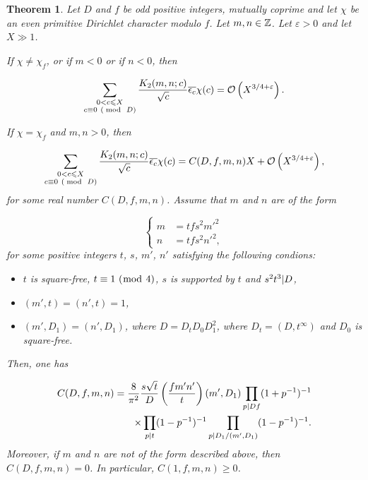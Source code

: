 \documentclass[leqno,10pt]{amsart}
\theoremstyle{plain}
\numberwithin{equation}{section}
\newtheorem{thm}{Theorem}[section]
\theoremstyle{definition}
\theoremstyle{remark}
\begin{document}
\begin{thm}\label{intro:thm}
Let $D$ and $f$ be odd positive integers, mutually coprime and let $\chi$ be an even primitive Dirichlet character modulo $f$. Let $m,n\in \mathbb{Z}$. Let $\varepsilon>0$ and let $X\gg 1$. 

If $\chi\neq \chi_f$, or if $m<0$ or if $n<0$, then

\begin{equation*}
\sum_{\substack{0<c\leqslant X \\ c\equiv 0\ (\bmod\  D)}}
\frac{K_2(m,n;c)}{\sqrt{c}} \overline{\epsilon_c} \chi(c) = \mathcal{O}\left(X^{3/4+\varepsilon}\right).
\end{equation*}

If $\chi=\chi_f$ and $m,n>0$, then
 
\begin{equation*}
\sum_{\substack{0<c\leqslant X \\ c\equiv 0\ (\bmod\  D)}}
\frac{K_2(m,n;c)}{\sqrt{c}} \overline{\epsilon_c} \chi(c) = C(D,f,m,n) X +\mathcal{O}\left(X^{3/4+\varepsilon}\right),
\end{equation*}
for some real number $C(D,f,m,n)$. Assume that $m$ and $n$ are of the form 

\begin{equation*}
\left\{\begin{aligned}
m&=tfs^2m'^2\\
n&=tfs^2n'^2,
\end{aligned}\right.
\end{equation*}
for some positive integers $t$, $s$, $m'$, $n'$ satisfying the following condions:

\begin{itemize}
\item[$(i)$] $t$ is square-free, $t\equiv 1 \ (\bmod\  4)$, $s$ is supported by $t$ and $s^2t^3 \vert D$,
\item[$(ii)$] $(m',t)=(n',t)=1$,
\item[$(iii)$] $(m',D_1)=(n',D_1)$, where $D=D_tD_0D_1^2$, where $D_t=(D,t^\infty)$ and $D_0$ is square-free.
\end{itemize}
Then, one has

\begin{equation*}
\begin{split}
C(D,f,m,n) = \frac{8}{\pi^2} \frac{s\sqrt{t}}{D} \left(\frac{fm'n'}{t}\right) (m',D_1) \prod_{p\vert Df} (1+p^{-1})^{-1} \\
\times \prod_{p\vert t}(1-p^{-1})^{-1} \prod_{p\vert D_1/(m',D_1)}(1-p^{-1})^{-1}.
\end{split}
\end{equation*}
Moreover, if $m$ and $n$ are not of the form described above, then $C(D,f,m,n)=0$. In particular, $C(1,f,m,n)\ge 0$.
\end{thm}
\end{document}
